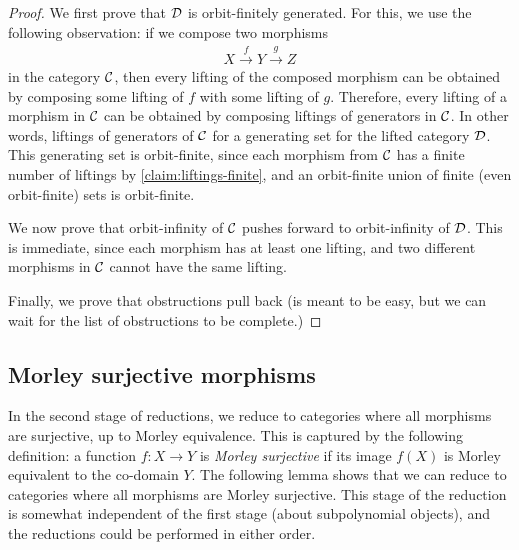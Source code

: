 \begin{proof}
We first prove that ${\mathcal D}$ is orbit-finitely generated. For this, we use the following observation: if we compose two morphisms 
\begin{align*}
X \stackrel{f} \to Y \stackrel{g} \to Z
\end{align*}
in the category ${\mathcal C}$, 
then every lifting of the composed morphism can be obtained by composing some lifting of $f$ with some lifting of $g$. Therefore, every lifting of a morphism in ${\mathcal C}$ can be obtained by composing liftings of generators in ${\mathcal C}$.  In other words, liftings of generators of ${\mathcal C}$ for a generating set for the lifted category ${\mathcal D}$. This generating set is orbit-finite, since each morphism from ${\mathcal C}$ has a finite number of liftings by  \cref{claim:liftings-finite}, and an  orbit-finite union of finite (even orbit-finite) sets is orbit-finite.

We now prove that orbit-infinity of ${\mathcal C}$ pushes forward to orbit-infinity of ${\mathcal D}$. This is immediate, since each morphism has at least one lifting, and two different morphisms in ${\mathcal C}$ cannot have the same lifting. 

Finally, we prove that obstructions pull back (is meant to be easy, but we can wait for the list of obstructions to be complete.)
\end{proof}



\subsection{Morley surjective morphisms}
\label{sec:almost-surjective-morphisms}
In the second stage of reductions, we reduce to categories where all morphisms are surjective, up to Morley equivalence. This is captured by the following definition:  a function $f : X \to Y$ is \emph{Morley surjective} if its image $f(X)$ is Morley equivalent to the co-domain $Y$. The following lemma shows that we can reduce to categories where all morphisms are Morley surjective. This stage of the reduction is somewhat independent of the first stage (about subpolynomial objects), and the reductions could be performed in either order. 


